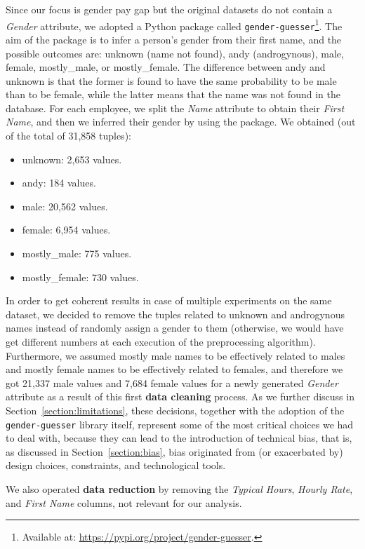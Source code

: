 Since our focus is gender pay gap but the original datasets do not contain a \textit{Gender} attribute, we adopted a Python package called \texttt{gender-guesser}\footnote{Available at: \url{https://pypi.org/project/gender-guesser}.}. The aim of the package is to infer a person's gender from their first name, and the possible outcomes are: unknown (name not found), andy (androgynous), male, female, mostly\_male, or mostly\_female. The difference between andy and unknown is that the former is found to have the same probability to be male than to be female, while the latter means that the name was not found in the database. For each employee, we split the \textit{Name} attribute to obtain their \textit{First Name}, and then we inferred their gender by using the package. We obtained (out of the total of 31,858 tuples):
\begin{itemize}
\item unknown: 2,653 values.
\item andy: 184 values.
\item male: 20,562 values.
\item female: 6,954 values.
\item mostly\_male: 775 values.
\item mostly\_female: 730 values.
\end{itemize}
In order to get coherent results in case of multiple experiments on the same dataset, we decided to remove the tuples related to unknown and androgynous names instead of randomly assign a gender to them (otherwise, we would have get different numbers at each execution of the preprocessing algorithm). Furthermore, we assumed mostly male names to be effectively related to males and mostly female names to be effectively related to females, and therefore we got 21,337 male values and 7,684 female values for a newly generated \textit{Gender} attribute as a result of this first \textbf{data cleaning} process. As we further discuss in Section~\ref{section:limitations}, these decisions, together with the adoption of the \texttt{gender-guesser} library itself, represent some of the most critical choices we had to deal with, because they can lead to the introduction of technical bias, that is, as discussed in Section~\ref{section:bias}, bias originated from (or exacerbated by) design choices, constraints, and technological tools.

We also operated \textbf{data reduction} by removing the \textit{Typical Hours}, \textit{Hourly Rate}, and \textit{First Name} columns, not relevant for our analysis.

